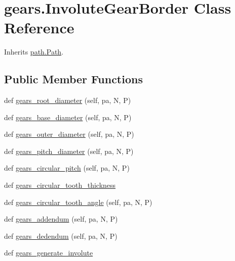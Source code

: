 \hypertarget{classgears_1_1_involute_gear_border}{}\section{gears.\+Involute\+Gear\+Border Class Reference}
\label{classgears_1_1_involute_gear_border}


Inherits \hyperlink{classpath_1_1_path}{path.\+Path}.

\subsection*{Public Member Functions}
\begin{DoxyCompactItemize}
\item 
def \hyperlink{classgears_1_1_involute_gear_border_a8d74dca4e67f48499a9cc6934c9a414d}{gears\+\_\+root\+\_\+diameter} (self, pa, N, P)
\item 
def \hyperlink{classgears_1_1_involute_gear_border_a65571c455a662b6c7f354c553257610a}{gears\+\_\+base\+\_\+diameter} (self, pa, N, P)
\item 
def \hyperlink{classgears_1_1_involute_gear_border_a3cd564500fb7f58919bdd70e1ae78bd5}{gears\+\_\+outer\+\_\+diameter} (self, pa, N, P)
\item 
def \hyperlink{classgears_1_1_involute_gear_border_ad23633c9fe1834febbc0322d2d7d879f}{gears\+\_\+pitch\+\_\+diameter} (self, pa, N, P)
\item 
def \hyperlink{classgears_1_1_involute_gear_border_aac568e6869352d0a0371a4eb7025ad91}{gears\+\_\+circular\+\_\+pitch} (self, pa, N, P)
\item 
def \hyperlink{classgears_1_1_involute_gear_border_aa69471dcaf9c032399a256e85c75f49d}{gears\+\_\+circular\+\_\+tooth\+\_\+thickness}
\item 
def \hyperlink{classgears_1_1_involute_gear_border_ae07ce4ec4f0069ddbc8bbef49b9a90f3}{gears\+\_\+circular\+\_\+tooth\+\_\+angle} (self, pa, N, P)
\item 
def \hyperlink{classgears_1_1_involute_gear_border_af4ed589c57bdb09b0ad868841e3b9c67}{gears\+\_\+addendum} (self, pa, N, P)
\item 
def \hyperlink{classgears_1_1_involute_gear_border_a8d6aac9c342cd973de0cc1a8c507436c}{gears\+\_\+dedendum} (self, pa, N, P)
\item 
def \hyperlink{classgears_1_1_involute_gear_border_af2d4556bd75f0883cf277f4bc217e703}{gears\+\_\+generate\+\_\+involute}
\item 

\end{DoxyCompactItemize}
